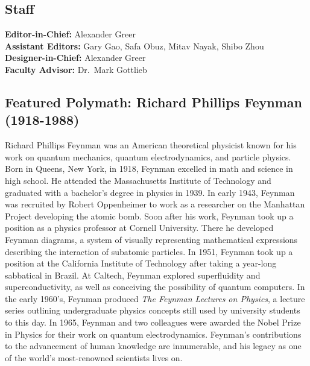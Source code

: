\documentclass[12pt]{article}
\begin{document}
\subsection*{Staff}
{\centering{}
    \textbf{Editor-in-Chief:} Alexander Greer
    \\
    \textbf{Assistant Editors:} Gary Gao, Safa Obuz, Mitav Nayak, Shibo Zhou
    \\
    \textbf{Designer-in-Chief:} Alexander Greer
    \\
    \textbf{Faculty Advisor:} Dr.\ Mark Gottlieb
    \\}
\subsection*{Featured Polymath: Richard Phillips Feynman (1918-1988)}
Richard Phillips Feynman was an American theoretical physicist known for his work on quantum mechanics, quantum electrodynamics, and particle physics. Born in Queens, New York, in 1918, Feynman excelled in math and science in high school. He attended the Massachusetts Institute of Technology and graduated with a bachelor’s degree in physics in 1939. In early 1943, Feynman was recruited by Robert Oppenheimer to work as a researcher on the Manhattan Project developing the atomic bomb. Soon after his work, Feynman took up a position as a physics professor at Cornell University. There he developed Feynman diagrams, a system of visually representing mathematical expressions describing the interaction of subatomic particles. In 1951, Feynman took up a position at the California Institute of Technology after taking a year-long sabbatical in Brazil. At Caltech, Feynman explored superfluidity and superconductivity, as well as conceiving the possibility of quantum computers. In the early 1960’s, Feynman produced \textit{The Feynman Lectures on Physics}, a lecture series outlining undergraduate physics concepts still used by university students to this day. In 1965, Feynman and two colleagues were awarded the Nobel Prize in Physics for their work on quantum electrodynamics. Feynman’s contributions to the advancement of human knowledge are innumerable, and his legacy as one of the world’s most-renowned scientists lives on. 
\newpage


\def\currentTitleWallpaper{Pure_Math_Border_Title.pdf}
\end{document}
